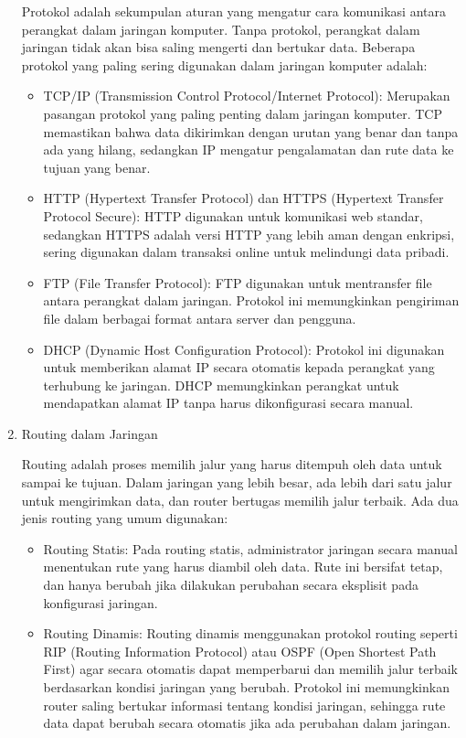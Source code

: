 \begin{enumerate}
	Protokol adalah sekumpulan aturan yang mengatur cara komunikasi antara perangkat dalam jaringan komputer. Tanpa protokol, perangkat dalam jaringan tidak akan bisa saling mengerti dan bertukar data. Beberapa protokol yang paling sering digunakan dalam jaringan komputer adalah:
	\begin{itemize}
		 \item TCP/IP (Transmission Control Protocol/Internet Protocol): Merupakan pasangan protokol yang paling penting dalam jaringan komputer. TCP memastikan bahwa data dikirimkan dengan urutan yang benar dan tanpa ada yang hilang, sedangkan IP mengatur pengalamatan dan rute data ke tujuan yang benar.
		 \item HTTP (Hypertext Transfer Protocol) dan HTTPS (Hypertext Transfer Protocol Secure): HTTP digunakan untuk komunikasi web standar, sedangkan HTTPS adalah versi HTTP yang lebih aman dengan enkripsi, sering digunakan dalam transaksi online untuk melindungi data pribadi.
		 \item FTP (File Transfer Protocol): FTP digunakan untuk mentransfer file antara perangkat dalam jaringan. Protokol ini memungkinkan pengiriman file dalam berbagai format antara server dan pengguna.
		 \item DHCP (Dynamic Host Configuration Protocol): Protokol ini digunakan untuk memberikan alamat IP secara otomatis kepada perangkat yang terhubung ke jaringan. DHCP memungkinkan perangkat untuk mendapatkan alamat IP tanpa harus dikonfigurasi secara manual.
	\end{itemize}
	\item Routing dalam Jaringan
	
	Routing adalah proses memilih jalur yang harus ditempuh oleh data untuk sampai ke tujuan. Dalam jaringan yang lebih besar, ada lebih dari satu jalur untuk mengirimkan data, dan router bertugas memilih jalur terbaik. Ada dua jenis routing yang umum digunakan:
	\begin{itemize}
		 \item Routing Statis: Pada routing statis, administrator jaringan secara manual menentukan rute yang harus diambil oleh data. Rute ini bersifat tetap, dan hanya berubah jika dilakukan perubahan secara eksplisit pada konfigurasi jaringan.
		 \item Routing Dinamis: Routing dinamis menggunakan protokol routing seperti RIP (Routing Information Protocol) atau OSPF (Open Shortest Path First) agar secara otomatis dapat memperbarui dan memilih jalur terbaik berdasarkan kondisi jaringan yang berubah. Protokol ini memungkinkan router saling bertukar informasi tentang kondisi jaringan, sehingga rute data dapat berubah secara otomatis jika ada perubahan dalam jaringan.
	\end{itemize}


\end{enumerate}
